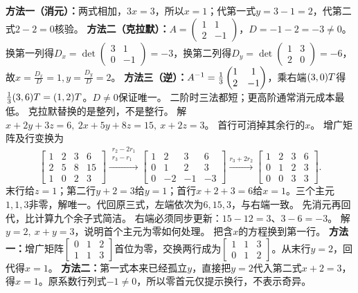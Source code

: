 {\textbf{方法一（消元）：}两式相加，$3x=3$，所以$x=1$；代第一式$y=3-1=2$，代第二式$2-2=0$核验。
\textbf{方法二（克拉默）：}$A=\begin{pmatrix}1&1\\2&-1\end{pmatrix}$，$D=-1-2=-3\ne0$。换第一列得$D_x=\det\begin{pmatrix}3&1\\0&-1\end{pmatrix}=-3$，换第二列得$D_y=\det\begin{pmatrix}1&3\\2&0\end{pmatrix}=-6$，故$x=\frac{D_x}{D}=1,y=\frac{D_y}{D}=2$。
\textbf{方法三（逆）：}$A^{-1}=\frac13\begin{pmatrix}1&1\\2&-1\end{pmatrix}$，乘右端$(3,0)T$得$\frac13(3,6)T=(1,2)T$。$D\ne0$保证唯一。}
{二阶时三法都短；更高阶通常消元成本最低。}
{克拉默替换的是整列，不是整行。}
{解$x+2y+3z=6,\ 2x+5y+8z=15,\ x+2z=3$。}
{首行可消掉其余行的$x$。}
{增广矩阵及行变换为
\[\left[\begin{array}{ccc|c}1&2&3&6\\2&5&8&15\\1&0&2&3\end{array}\right]
\xrightarrow{\substack{r_2-2r_1\\r_3-r_1}}
\left[\begin{array}{ccc|c}1&2&3&6\\0&1&2&3\\0&-2&-1&-3\end{array}\right]
\xrightarrow{r_3+2r_2}
\left[\begin{array}{ccc|c}1&2&3&6\\0&1&2&3\\0&0&3&3\end{array}\right].\]
末行给$z=1$；第二行$y+2=3$给$y=1$；首行$x+2+3=6$给$x=1$。三个主元$1,1,3$非零，解唯一。代回原三式，左端依次为$6,15,3$，与右端一致。}
{先消元再回代，比计算九个余子式简洁。}
{右端必须同步更新：$15-12=3$、$3-6=-3$。}
{解$y=2,\ x+y=3$，说明首个主元为零如何处理。}
{把含$x$的方程换到第一行。}
{\textbf{方法一：}增广矩阵$\left[\begin{array}{cc|c}0&1&2\\1&1&3\end{array}\right]$首位为零，交换两行成为$\left[\begin{array}{cc|c}1&1&3\\0&1&2\end{array}\right]$。从末行$y=2$，回代得$x=1$。
\textbf{方法二：}第一式本来已经孤立$y$，直接把$y=2$代入第二式$x+2=3$，得$x=1$。原系数行列式$-1\ne0$，所以零首元仅提示换行，不表示奇异。}
